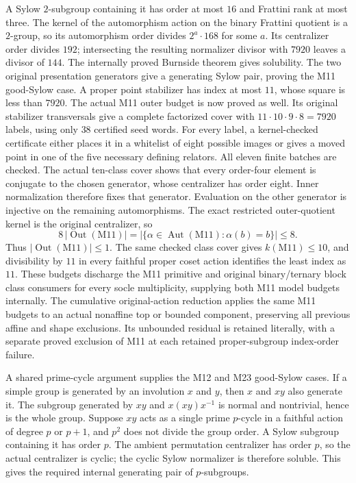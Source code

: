 A Sylow $2$-subgroup containing it has order at most $16$ and
Frattini rank at most three. The kernel of the automorphism action on
the binary Frattini quotient is a $2$-group, so its automorphism order divides
$2^a\cdot168$ for some $a$. Its centralizer order divides $192$;
intersecting the resulting normalizer divisor with $7920$ leaves
a divisor of $144$. The internally proved Burnside theorem gives
solubility. The two original presentation generators give a generating
Sylow pair, proving the M11 good-Sylow case. A proper point stabilizer
has index at most $11$, whose square is less than $7920$.
The actual M11 outer budget is now proved as well. Its original
stabilizer transversals give a complete factorized cover with
$11\cdot10\cdot9\cdot8=7920$ labels, using only $38$ certified seed
words. For every label, a kernel-checked certificate either places it
in a whitelist of eight possible images or gives a moved point in one
of the five necessary defining relators. All eleven finite batches
are checked. The actual ten-class cover shows that every order-four
element is conjugate to the chosen generator, whose centralizer has
order eight. Inner normalization therefore fixes that generator.
Evaluation on the other generator is injective on the remaining
automorphisms. The exact restricted outer-quotient kernel is the
original centralizer, so
\[
  8\,|\operatorname{Out}(\mathrm{M11})|
  =|\{\alpha\in\operatorname{Aut}(\mathrm{M11}):\alpha(b)=b\}|
  \leq8.
\]
Thus $|\operatorname{Out}(\mathrm{M11})|\leq1$. The same checked class
cover gives $k(\mathrm{M11})\leq10$, and divisibility by $11$ in every
faithful proper coset action identifies the least index as $11$.
These budgets discharge the M11 primitive and original binary/ternary
block class consumers for every socle multiplicity, supplying both
M11 model budgets internally.
The cumulative original-action reduction applies the same M11 budgets
to an actual nonaffine top or bounded component, preserving all previous
affine and shape exclusions. Its unbounded residual is retained
literally, with a separate proved exclusion of M11 at each retained
proper-subgroup index-order failure.

A shared prime-cycle argument supplies the M12 and M23 good-Sylow
cases. If a simple group is generated by an involution $x$ and $y$,
then $x$ and $xy$ also generate it. The subgroup generated by $xy$
and $x(xy)x^{-1}$ is normal and nontrivial, hence is the whole group.
Suppose $xy$ acts as a single prime $p$-cycle in a faithful action
of degree $p$ or $p+1$, and $p^2$ does not divide the group order.
A Sylow subgroup containing it has order $p$. The ambient permutation
centralizer has order $p$, so the actual centralizer is cyclic; the
cyclic Sylow normalizer is therefore soluble. This gives the required
internal generating pair of $p$-subgroups.

